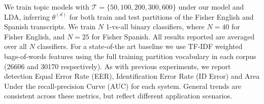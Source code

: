 We train topic models with $\mathcal{T}=\{50,100,200,300,600\}$ under our model and LDA, inferring  $\theta^{(d)}$ for both train and test partitions of the Fisher English and Spanish transcripts.  We train $N$ 1-vs-all binary classifiers, where $N=40$ for Fisher English, and $N=25$ for Fisher Spanish.  All results reported are averaged over all $N$ classifiers.  For a state-of-the art baseline we use TF-IDF weighted bags-of-words features using the full training partition vocabulary in each corpus (26606 and 30170 respectively).  As with previous experiments, we report detection Equal Error Rate (EER), Identification Error Rate (ID Error) and Area Under the recall-precision Curve (AUC) for each system.  General trends are consistent across these metrics, but reflect different application scenarios.


\begin{figure}
\begin{center}
\hfill
{} \\
\end{center}
\end{figure}
